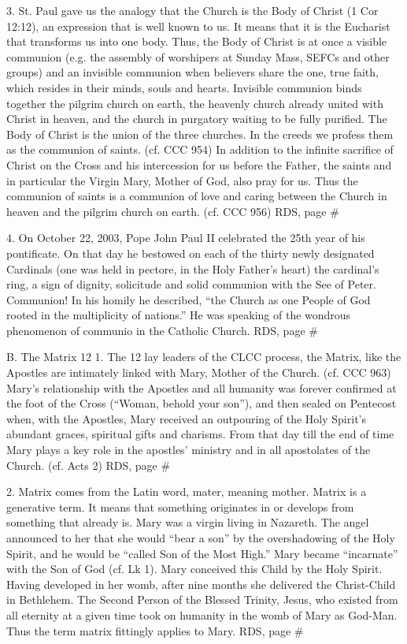 \documentclass[oneside]{book}
\begin{document}
3. St. Paul gave us the analogy that the Church is the Body of Christ (1 Cor
12:12), an expression that is well known to us. It means that it is the
Eucharist that transforms us into one body. Thus, the Body of Christ is at once
a visible communion (e.g. the assembly of worshipers at Sunday Mass, SEFCs and
other groups) and an invisible communion when believers share the one, true
faith, which resides in their minds, souls and hearts. Invisible communion binds
together the pilgrim church on earth, the heavenly church already united with
Christ in heaven, and the church in purgatory waiting to be fully purified. The
Body of Christ is the union of the three churches. In the creeds we profess them
as the communion of saints. (cf. CCC 954)
In addition to the infinite sacrifice of Christ on the Cross and his
intercession for us before the Father, the saints and in particular the Virgin
Mary, Mother of God, also pray for us. Thus the communion of saints is a
communion of love and caring between the Church in heaven and the pilgrim church
on earth. (cf. CCC 956)
RDS, page \#

4. On October 22, 2003, Pope John Paul II celebrated the 25th year of his
pontificate. On that day he bestowed on each of the thirty newly designated
Cardinals (one was held in pectore, in the Holy Father's heart) the cardinal's
ring, a sign of dignity, solicitude and solid communion with the See of
Peter. Communion! In his homily he described, ``the Church as one People of God
rooted in the multiplicity of nations.'' He was speaking of the wondrous
phenomenon of communio in the Catholic Church.
RDS, page \#

B. The Matrix 12
1. The 12 lay leaders of the CLCC process, the Matrix, like the Apostles are
intimately linked with Mary, Mother of the Church. (cf. CCC 963) Mary's
relationship with the Apostles and all humanity was forever confirmed at the
foot of the Cross (``Woman, behold your son''), and then sealed on Pentecost
when, with the Apostles, Mary received an outpouring of the Holy Spirit's
abundant graces, spiritual gifts and charisms. From that day till the end of
time Mary plays a key role in the apostles' ministry and in all apostolates of
the Church. (cf. Acts 2)
RDS, page \#

2. Matrix comes from the Latin word, mater, meaning mother. Matrix is a
generative term. It means that something originates in or develops from
something that already is. Mary was a virgin living in Nazareth. The angel
announced to her that she would ``bear a son'' by the overshadowing of the Holy
Spirit, and he would be ``called Son of the Most High.'' Mary became
``incarnate'' with the Son of God (cf. Lk 1). Mary conceived this Child by the
Holy Spirit. Having developed in her womb, after nine months she delivered the
Christ-Child in Bethlehem. The Second Person of the Blessed Trinity, Jesus, who
existed from all eternity at a given time took on humanity in the womb of Mary
as God-Man. Thus the term matrix fittingly applies to Mary.
RDS, page \#
\end{document}
